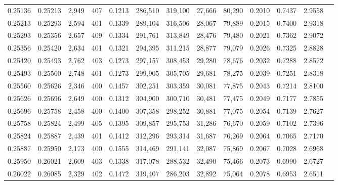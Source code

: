 \begin{tabular}{rrrrrrrrrrrrr}
0.25136 & 0.25213 &  2,949 & 407 &                                     0.1213 & 286,510 & 319,100 &  27,666 &  80,290 & 0.2010 & 0.7437 & 2.9558 \\
0.25213 & 0.25293 &  2,594 & 401 &                                     0.1339 & 289,104 & 316,506 &  28,067 &  79,889 & 0.2015 & 0.7400 & 2.9318 \\
0.25293 & 0.25356 &  2,657 & 409 &                                     0.1334 & 291,761 & 313,849 &  28,476 &  79,480 & 0.2021 & 0.7362 & 2.9072 \\
0.25356 & 0.25420 &  2,634 & 401 &                                     0.1321 & 294,395 & 311,215 &  28,877 &  79,079 & 0.2026 & 0.7325 & 2.8828 \\
0.25420 & 0.25493 &  2,762 & 403 &                                     0.1273 & 297,157 & 308,453 &  29,280 &  78,676 & 0.2032 & 0.7288 & 2.8572 \\
0.25493 & 0.25560 &  2,748 & 401 &                                     0.1273 & 299,905 & 305,705 &  29,681 &  78,275 & 0.2039 & 0.7251 & 2.8318 \\
0.25560 & 0.25626 &  2,346 & 400 &                                     0.1457 & 302,251 & 303,359 &  30,081 &  77,875 & 0.2043 & 0.7214 & 2.8100 \\
0.25626 & 0.25696 &  2,649 & 400 &                                     0.1312 & 304,900 & 300,710 &  30,481 &  77,475 & 0.2049 & 0.7177 & 2.7855 \\
0.25696 & 0.25758 &  2,458 & 400 &                                     0.1400 & 307,358 & 298,252 &  30,881 &  77,075 & 0.2054 & 0.7139 & 2.7627 \\
0.25758 & 0.25824 &  2,499 & 405 &                                     0.1395 & 309,857 & 295,753 &  31,286 &  76,670 & 0.2059 & 0.7102 & 2.7396 \\
0.25824 & 0.25887 &  2,439 & 401 &                                     0.1412 & 312,296 & 293,314 &  31,687 &  76,269 & 0.2064 & 0.7065 & 2.7170 \\
0.25887 & 0.25950 &  2,173 & 400 &                                     0.1555 & 314,469 & 291,141 &  32,087 &  75,869 & 0.2067 & 0.7028 & 2.6968 \\
0.25950 & 0.26021 &  2,609 & 403 &                                     0.1338 & 317,078 & 288,532 &  32,490 &  75,466 & 0.2073 & 0.6990 & 2.6727 \\
0.26022 & 0.26085 &  2,329 & 402 &                                     0.1472 & 319,407 & 286,203 &  32,892 &  75,064 & 0.2078 & 0.6953 & 2.6511 \\

\end{tabular}
